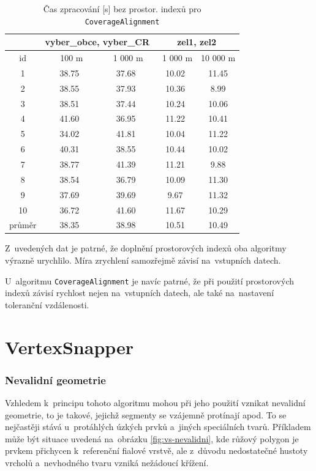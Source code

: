 \begin{table}
\centering
 \begin{tabular}{|c|c|c|c|c|}
  \hline
     & \multicolumn{2}{c|}{vyber\_obce, vyber\_CR} & 
	\multicolumn{2}{c|}{zel1, zel2} \\
  \hline
   id  &  ~~100 m~ & ~1 000 m & ~1 000 m & 10 000 m\\
  \hline
  \hline
1  & 38.75 & 37.68 & 10.02 & 11.45 \\ 
2  & 38.55 & 37.93 & 10.36 & 8.99  \\
3  & 38.51 & 37.44 & 10.24 & 10.06 \\
4  & 41.60 & 36.95 & 11.22 & 10.41 \\
5  & 34.02 & 41.81 & 10.04 & 11.22 \\
6  & 40.31 & 38.55 & 10.44 & 10.02 \\
7  & 38.77 & 41.39 & 11.21 & 9.88 \\
8  & 38.54 & 36.79 & 10.09 & 11.30 \\
9  & 37.69 & 39.69 & 9.67  & 11.32 \\
10 & 36.72 & 41.60 & 11.67 & 10.29 \\
  \hline
  \hline
  průměr & 38.35 & 38.98 & 10.51 & 10.49\\
  \hline
 \end{tabular}
  \caption{ Čas zpracování [s] bez prostor. indexů pro 
	    \texttt{Coverage\-Alignment}}
  \label{tab:ca-bez}
\end{table}

Z~uvedených dat je patrné, že doplnění prostorových indexů
oba algoritmy výrazně urychlilo. Míra zrychlení samozřejmě
závisí na~vstupních datech.

U~algoritmu \texttt{Coverage\-Alignment} je navíc patrné,
že při použití prostorových indexů závisí rychlost nejen
na~vstupních datech, ale také na~nastavení toleranční 
vzdálenosti. %

\section{VertexSnapper}
\label{problemy-vs}

\subsubsection{Nevalidní geometrie}
Vzhledem k~principu tohoto algoritmu mohou při jeho použití vznikat nevalidní 
geometrie, to je takové, jejichž segmenty se vzájemně protínají apod. 
To se nejčastěji stává u~protáhlých úzkých prvků a~jiných speciálních tvarů. 
Příkladem může být situace uvedená na~obrázku \ref{fig:vs-nevalidni}, 
kde růžový polygon je prvkem přichycen k~referenční fialové vrstvě, 
ale z~důvodu nedostatečné hustoty vrcholů a~nevhodného tvaru vzniká nežádoucí 
křížení.

